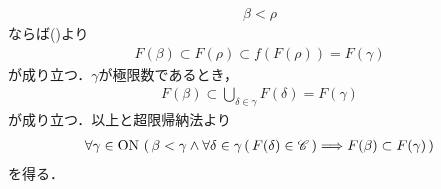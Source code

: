 \begin{sketch}
\begin{description}
\begin{align}
					\beta < \rho
				\end{align}
				ならば()より
				\begin{align}
					F(\beta) \subset F(\rho) \subset f(F(\rho)) = F(\gamma)
				\end{align}
				が成り立つ．$\gamma$が極限数であるとき，
				\begin{align}
					F(\beta) \subset \bigcup_{\delta \in \gamma} F(\delta) = F(\gamma)
				\end{align}
				が成り立つ．以上と超限帰納法より
				\begin{align}
					\forall \gamma \in \mathrm{ON}\, \left(\, \beta < \gamma \wedge
					\forall \delta \in \gamma\, (\, F(\delta) \in \mathscr{C}\, )
					\Longrightarrow F(\beta) \subset F(\gamma)\, \right)
				\end{align}
				を得る．
				

\end{description}
\end{sketch}
